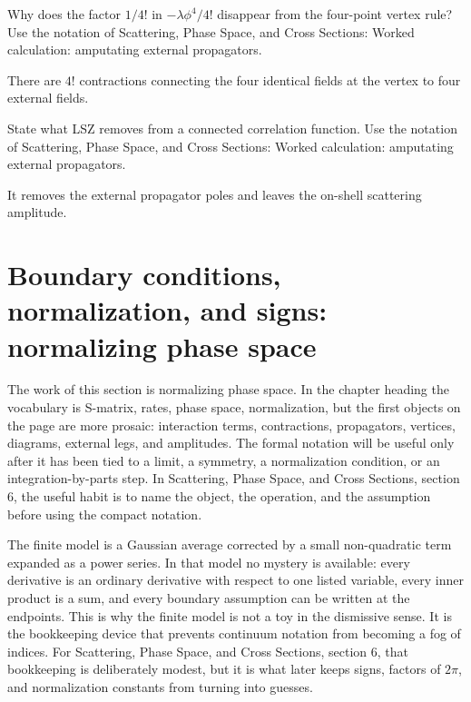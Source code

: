 \begin{exercise}
Why does the factor \(1/4!\) in \(-\lambda\phi^4/4!\) disappear from the four-point vertex rule?  Use the notation of Scattering, Phase Space, and Cross Sections: Worked calculation: amputating external propagators.
\begin{answer}
There are \(4!\) contractions connecting the four identical fields at the vertex to four external fields.
\end{answer}
\end{exercise}

\begin{exercise}
State what LSZ removes from a connected correlation function.  Use the notation of Scattering, Phase Space, and Cross Sections: Worked calculation: amputating external propagators.
\begin{answer}
It removes the external propagator poles and leaves the on-shell scattering amplitude.
\end{answer}
\end{exercise}



\section{Boundary conditions, normalization, and signs: normalizing phase space}

The work of this section is normalizing phase space.  In the chapter heading the vocabulary is S-matrix, rates, phase space, normalization, but the first objects on the page are more prosaic: interaction terms, contractions, propagators, vertices, diagrams, external legs, and amplitudes.  The formal notation will be useful only after it has been tied to a limit, a symmetry, a normalization condition, or an integration-by-parts step.  In Scattering, Phase Space, and Cross Sections, section 6, the useful habit is to name the object, the operation, and the assumption before using the compact notation.

The finite model is a Gaussian average corrected by a small non-quadratic term expanded as a power series.  In that model no mystery is available: every derivative is an ordinary derivative with respect to one listed variable, every inner product is a sum, and every boundary assumption can be written at the endpoints.  This is why the finite model is not a toy in the dismissive sense.  It is the bookkeeping device that prevents continuum notation from becoming a fog of indices.  For Scattering, Phase Space, and Cross Sections, section 6, that bookkeeping is deliberately modest, but it is what later keeps signs, factors of \(2\pi\), and normalization constants from turning into guesses.

